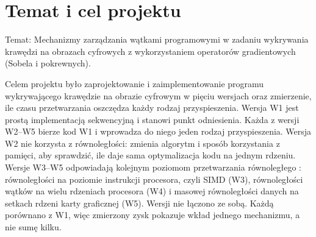 \documentclass[12pt,a4paper]{article}
\providecommand{\wynik}[1]{\textbf{??#1??}}
\newcommand{\douzup}[1]{{\color{red!70!black}\textit{[DOUZUP: #1]}}}
\begin{document}
\clearpage

\tableofcontents
\clearpage


\section{Temat i cel projektu}

Temat: Mechanizmy zarządzania wątkami programowymi w zadaniu wykrywania krawędzi na obrazach cyfrowych z wykorzystaniem operatorów gradientowych (Sobela i pokrewnych).

Celem projektu było zaprojektowanie i zaimplementowanie programu wykrywającego krawędzie na obrazie cyfrowym w pięciu wersjach oraz zmierzenie, ile czasu przetwarzania oszczędza każdy rodzaj przyspieszenia. Wersja W1 jest prostą implementacją sekwencyjną i stanowi punkt odniesienia. Każda z wersji W2--W5 bierze kod W1 i wprowadza do niego jeden rodzaj przyspieszenia. Wersja W2 nie korzysta z równoległości: zmienia algorytm i sposób korzystania z pamięci, aby sprawdzić, ile daje sama optymalizacja kodu na jednym rdzeniu. Wersje W3--W5 odpowiadają kolejnym poziomom przetwarzania równoległego \cite{czech}: równoległości na poziomie instrukcji procesora, czyli SIMD (W3), równoległości wątków na wielu rdzeniach procesora (W4) i masowej równoległości danych na setkach rdzeni karty graficznej (W5). Wersji nie łączono ze sobą. Każdą porównano z W1, więc zmierzony zysk pokazuje wkład jednego mechanizmu, a nie sumę kilku.
\end{document}
